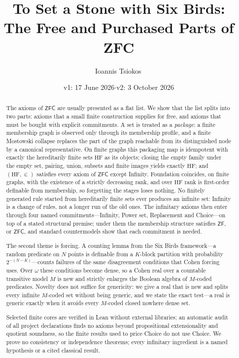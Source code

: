 \documentclass[11pt]{article}
\title{To Set a Stone with Six Birds:\\
The Free and Purchased Parts of ZFC}
\author{Ioannis Tsiokos\,\orcidlink{0009-0009-7659-5964}}
\date{v1: 17 June 2026\quad$\cdot$\quad v2: 3 October 2026}
\newcommand{\HF}{\mathrm{HF}}                 \newcommand{\rank}{\operatorname{rank}}
\theoremstyle{definition}
\begin{document}
\maketitle
\thispagestyle{firstpage}

\begin{abstract}
The axioms of $\mathsf{ZFC}$ are usually presented as a flat list. We show that the list splits
into two parts: axioms that a small finite construction supplies for free, and axioms that
must be bought with explicit commitments. A set is treated as a \emph{package}: a finite
membership graph is observed only through its membership profile, and a finite Mostowski
collapse replaces the part of the graph reachable from its distinguished node by a canonical
representative. On finite graphs this packaging map is
idempotent with exactly the hereditarily finite sets $\HF$ as its objects; closing the empty
family under the empty set, pairing, union, subsets and finite images yields exactly $\HF$; and $(\HF,\in)$
satisfies every axiom of $\mathsf{ZFC}$ except Infinity. Foundation coincides, on finite graphs,
with the existence of a strictly decreasing rank, and over $\HF$ rank is first-order
definable from membership, so forgetting the stages loses nothing. No finitely generated rule started from hereditarily finite sets ever produces an
infinite set: Infinity is a change of rules, not a longer run of the old ones. The infinitary
axioms then enter through four named commitments---Infinity, Power set, Replacement and
Choice---on top of a stated structural premise; under them the membership structure satisfies
$\mathsf{ZF}$, or $\mathsf{ZFC}$, and standard countermodels show that each commitment is needed.

The second theme is forcing. A counting lemma from the Six Birds framework---a random predicate
on $N$ points is definable from a $K$-block partition with probability $2^{-(N-K)}$---counts
failures of the same disagreement conditions that Cohen forcing uses. Over $\omega$ these
conditions become dense, so a Cohen real over a countable transitive model $M$ is new and strictly
enlarges the Boolean algebra of $M$-coded predicates. Novelty does not suffice for genericity: we
give a real that is new and splits every infinite $M$-coded set without being generic, and we
state the exact test---a real is generic exactly when it avoids every $M$-coded closed nowhere
dense set.

Selected finite cores are verified in Lean without external libraries; an automatic audit of
all project declarations finds no axioms beyond propositional extensionality and quotient
soundness, so the finite results used to price Choice do not use Choice. We prove no consistency
or independence theorems; every infinitary ingredient is a named hypothesis or a cited
classical result.
\end{abstract}
 
\end{document}
